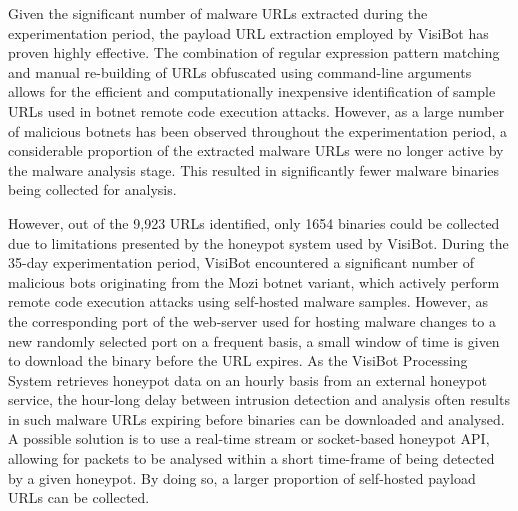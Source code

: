 Given the significant number of malware URLs extracted during the experimentation period, the payload URL extraction employed by VisiBot has proven highly effective. The combination of regular expression pattern matching and manual re-building of URLs obfuscated using command-line arguments allows for the efficient and computationally inexpensive identification of sample URLs used in botnet remote code execution attacks. However, as a large number of malicious botnets has been observed throughout the experimentation period, a considerable proportion of the extracted malware URLs were no longer active by the malware analysis stage. This resulted in significantly fewer malware binaries being collected for analysis. 

However, out of the 9,923 URLs identified, only 1654 binaries could be collected due to limitations presented by the honeypot system used by VisiBot. During the 35-day experimentation period, VisiBot encountered a significant number of malicious bots originating from the Mozi botnet variant, which actively perform remote code execution attacks using self-hosted malware samples. However, as the corresponding port of the web-server used for hosting malware changes to a new randomly selected port on a frequent basis, a small window of time is given to download the binary before the URL expires. As the VisiBot Processing System retrieves honeypot data on an hourly basis from an external honeypot service, the hour-long delay between intrusion detection and analysis often results in such malware URLs expiring before binaries can be downloaded and analysed. A possible solution is to use a real-time stream or socket-based honeypot API, allowing for packets to be analysed within a short time-frame of being detected by a given honeypot. By doing so, a larger proportion of self-hosted payload URLs can be collected.

